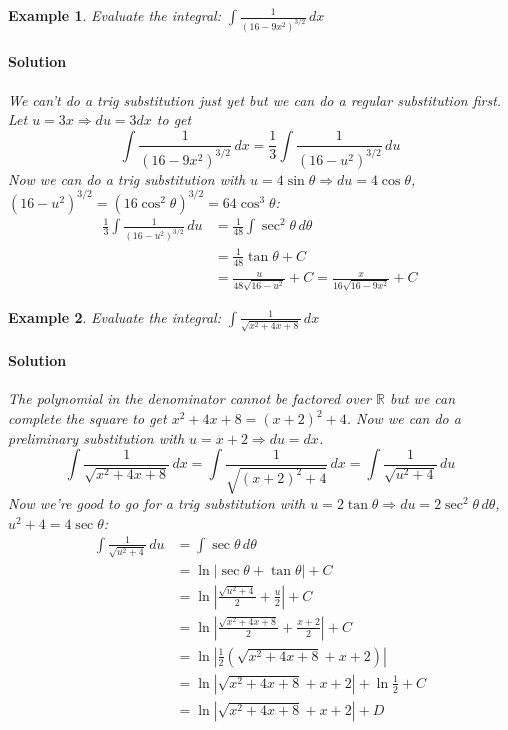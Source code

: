 \documentclass[letterpaper, 11pt, openany]{book}
\theoremstyle{mytheoremstyle}
\theoremstyle{myexamplestyle}
\newtheorem{example}{Example}[section]
\newenvironment{solution}{\paragraph{\sffamily \smaller \fontseries{b}\selectfont Solution}}{\hfill\faSquare}
\begin{document}
\begin{example}\label{e:trigsubprelimsub}
    Evaluate the integral: $\displaystyle \int \! \frac{1}{(16 - 9x^{2})^{3/2}}\, dx$
    
    \begin{solution}
        We can't do a trig substitution just yet but we can do a regular substitution first. Let $u = 3x \Rightarrow du = 3 dx$ to get
        \[
            \int \! \frac{1}{(16 - 9x^{2})^{3/2}}\, dx = \frac{1}{3} \int \frac{1}{(16 - u^{2})^{3/2}} \, du
        \]
        Now we can do a trig substitution with $u = 4\sin \theta \Rightarrow du = 4\cos \theta$, $(16-u^{2})^{3/2} = (16\cos^{2} \theta)^{3/2} = 64\cos^{3} \theta$:
        \begin{align*}
            \frac{1}{3} \int \frac{1}{(16 - u^{2})^{3/2}} \, du &= \frac{1}{48}\int \sec^{2}\theta \, d\theta \\
            &= \frac{1}{48}\tan \theta + C \\
            &= \frac{u}{48\sqrt{16-u^{2}}} + C =  \frac{x}{16\sqrt{16-9x^{2}}} + C
        \end{align*}
    \end{solution}
\end{example}

\begin{example}\label{e:trigsubcompsq}
    Evaluate the integral: $\displaystyle \int \frac{1}{\sqrt{x^{2} + 4x + 8}}\, dx$
    
    \begin{solution}
        The polynomial in the denominator cannot be factored over $\mathbb{R}$ but we can complete the square to get $x^{2} + 4x + 8 = (x+2)^{2} + 4$. Now we can do a preliminary substitution with $u = x + 2 \Rightarrow du = dx$.
        \[
            \int \frac{1}{\sqrt{x^{2} + 4x + 8}}\, dx = \int \frac{1}{\sqrt{(x+2)^{2} + 4}} \, dx = \int \frac{1}{\sqrt{u^{2} + 4}}\, du
        \]
        Now we're good to go for a trig substitution with $u = 2\tan \theta \Rightarrow du = 2\sec^{2} \theta \, d\theta$, $u^{2} + 4 = 4\sec \theta$:
        \begin{align*}
            \int \frac{1}{\sqrt{u^{2} + 4}}\, du &= \int \sec \theta \, d\theta \\
            &= \ln |\sec \theta + \tan \theta| + C \\
            &= \ln \left| \frac{\sqrt{u^{2} + 4}}{2} + \frac{u}{2}\right| + C \\
            &= \ln \left| \frac{\sqrt{x^{2} + 4x + 8}}{2} + \frac{x + 2}{2}\right| + C\\
            &= \ln \left| \frac{1}{2}\left(\sqrt{x^{2} + 4x + 8} + x + 2\right)\right|\\
            &= \ln \left| \sqrt{x^{2} + 4x + 8} + x + 2\right| + \ln \frac{1}{2} + C\\
            &= \ln \left| \sqrt{x^{2} + 4x + 8} + x + 2\right| + D
        \end{align*}
    \end{solution}
\end{example}
\end{document}
